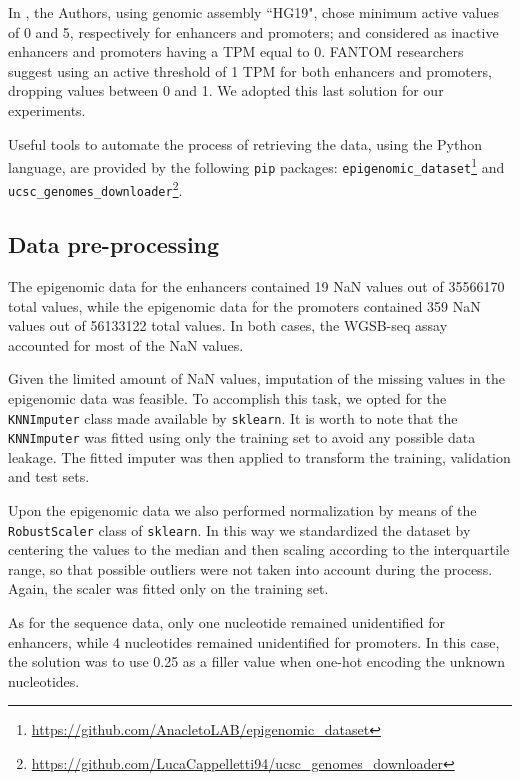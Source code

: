 \documentclass{article}
\begin{document}
In \cite{li_wasserman18}, the Authors, using genomic assembly  “HG19", chose minimum active values of 0 and 5, respectively for enhancers and promoters; and considered as inactive enhancers and promoters having a TPM equal to 0. FANTOM researchers suggest using an active threshold of 1 TPM for both enhancers and promoters, dropping values between 0 and 1. We adopted this last solution for our experiments.

Useful tools to automate the process of retrieving the data, using the Python language, are provided by the following \texttt{pip} packages: \texttt{epigenomic\_dataset}\footnote{\url{https://github.com/AnacletoLAB/epigenomic_dataset}} and \texttt{ucsc\_genomes\_downloader}\footnote{\url{https://github.com/LucaCappelletti94/ucsc_genomes_downloader}}.


\subsection{Data pre-processing}
\label{subsec:exp:data_preprocessing}

The epigenomic data for the enhancers contained 19 NaN values out of 35566170 total values, while the epigenomic data for the promoters contained 359 NaN values out of 56133122 total values. In both cases, the WGSB-seq assay accounted for most of the NaN values.

Given the limited amount of NaN values, imputation of the missing values in the epigenomic data was feasible. To accomplish this task, we opted for the \texttt{KNNImputer} class made available by \texttt{sklearn}. It is worth to note that the \texttt{KNNImputer} was fitted using only the training set to avoid any possible data leakage. The fitted imputer was then applied to transform the training, validation and test sets.

Upon the epigenomic data we also performed normalization by means of the \texttt{RobustScaler} class of \texttt{sklearn}. In this way we standardized the dataset by centering the values to the median and then scaling according to the interquartile range, so that possible outliers were not taken into account during the process. Again, the scaler was fitted only on the training set.

As for the sequence data, only one nucleotide remained unidentified for enhancers, while 4 nucleotides remained unidentified for promoters. In this case, the solution was to use 0.25 as a filler value when one-hot encoding the unknown nucleotides.
\end{document}
